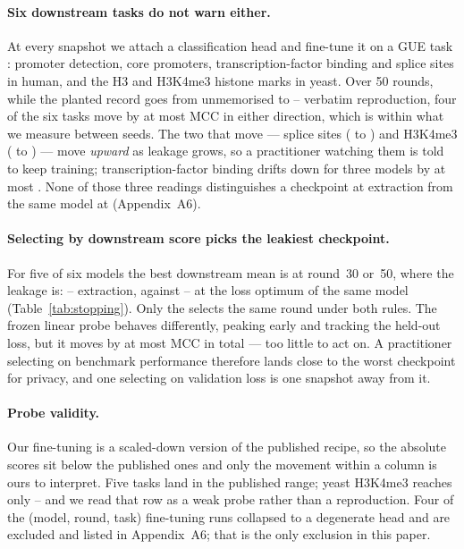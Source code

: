 \paragraph{Six downstream tasks do not warn either.}
At every snapshot we attach a classification head and fine-tune it on a GUE task
\cite{zhou2024dnabert2}: promoter detection, core promoters, transcription-factor binding and splice
sites in human, and the H3 and H3K4me3 histone marks in yeast. Over 50 rounds, while the planted
record goes from unmemorised to -- verbatim reproduction, four of the six tasks
move by at most  MCC in either direction, which is within what we measure between seeds.
The two that move --- splice sites ( to ) and H3K4me3 ( to
) --- move \emph{upward} as leakage grows, so a practitioner watching them is told to keep
training; transcription-factor binding drifts down for three models by at most . None of
those three readings distinguishes a checkpoint at  extraction from the same model at
 (Appendix~A6).

\paragraph{Selecting by downstream score picks the leakiest checkpoint.}
For five of six models the best downstream mean is at round~30 or~50, where the leakage is:
-- extraction, against -- at the loss optimum of the same model
(Table~\ref{tab:stopping}). Only the  selects the same round under both rules. The frozen
linear probe behaves differently, peaking early and tracking the held-out loss, but it moves by at
most  MCC in total --- too little to act on. A practitioner selecting on benchmark
performance therefore lands close to the worst checkpoint for privacy, and one selecting on
validation loss is one snapshot away from it.

\paragraph{Probe validity.}
Our fine-tuning is a scaled-down version of the published recipe, so the absolute scores sit below
the published ones and only the movement within a column is ours to interpret. Five tasks land in
the published range; yeast H3K4me3 reaches only -- and we read that row as a
weak probe rather than a reproduction. Four of the  (model, round, task) fine-tuning runs
collapsed to a degenerate head and are excluded and listed in Appendix~A6; that is the only
exclusion in this paper.
